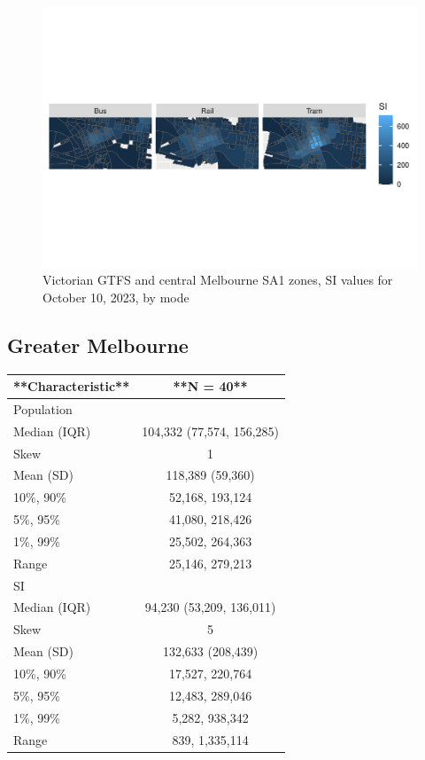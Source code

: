 \documentclass[preprint, 3p,
authoryear]{elsarticle} %
\begin{document}
\begin{figure}
\centering
\includegraphics{Leveraging_GTFS_to_assess_transit_supply_Transport_Geography_files/figure-latex/Melbourne_CBD_map_230808-1.pdf}
\caption{Victorian GTFS and central Melbourne SA1 zones, SI values for
October 10, 2023, by mode}
\end{figure}

\hypertarget{greater-melbourne}{%
\subsection{Greater Melbourne}\label{greater-melbourne}}

\begin{tabular}{l|c}
\hline
**Characteristic** & **N = 40**\\
\hline
Population & \\
\hline
Median (IQR) & 104,332 (77,574, 156,285)\\
\hline
Skew & 1\\
\hline
Mean (SD) & 118,389 (59,360)\\
\hline
10\%, 90\% & 52,168, 193,124\\
\hline
5\%, 95\% & 41,080, 218,426\\
\hline
1\%, 99\% & 25,502, 264,363\\
\hline
Range & 25,146, 279,213\\
\hline
SI & \\
\hline
Median (IQR) & 94,230 (53,209, 136,011)\\
\hline
Skew & 5\\
\hline
Mean (SD) & 132,633 (208,439)\\
\hline
10\%, 90\% & 17,527, 220,764\\
\hline
5\%, 95\% & 12,483, 289,046\\
\hline
1\%, 99\% & 5,282, 938,342\\
\hline
Range & 839, 1,335,114\\
\hline
\end{tabular}
\end{document}
